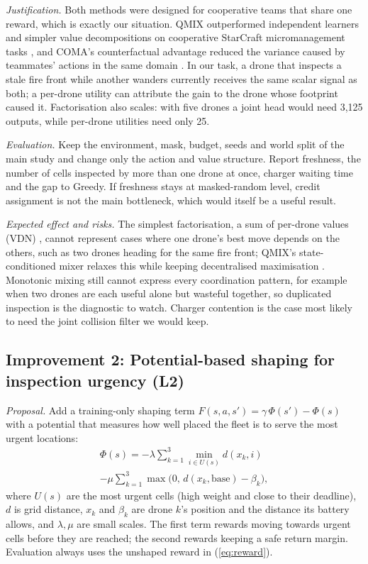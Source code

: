 \emph{Justification.} Both methods were designed for cooperative teams that share one reward,
which is exactly our situation. QMIX outperformed independent learners and simpler value
decompositions on cooperative StarCraft micromanagement tasks \cite{rashid2018}, and COMA's
counterfactual advantage reduced the variance caused by teammates' actions in the same domain
\cite{foerster2018coma}. In our task, a drone that inspects a stale fire front while another
wanders currently receives the same scalar signal as both; a per-drone utility can attribute
the gain to the drone whose footprint caused it. Factorisation also scales: with five
drones a joint head would need 3{,}125 outputs, while per-drone utilities need only 25.

\emph{Evaluation.} Keep the environment, mask, budget, seeds and world split of the main study
and change only the action and value structure. Report freshness, the number of
cells inspected by more than one drone at once, charger waiting time and the gap to Greedy.
If freshness stays at masked-random level, credit assignment is not the main bottleneck,
which would itself be a useful result.

\emph{Expected effect and risks.} The simplest factorisation, a sum of per-drone values (VDN)
\cite{sunehag2018}, cannot represent cases where one drone's best move depends on the others,
such as two drones heading for the same fire front; QMIX's state-conditioned mixer relaxes
this while keeping decentralised maximisation \cite{rashid2018}. Monotonic mixing still cannot
express every coordination pattern, for example when two drones are each useful alone but
wasteful together, so duplicated inspection is the diagnostic to watch. Charger contention is
the case most likely to need the joint collision filter we would keep.

\subsection{Improvement 2: Potential-based shaping for inspection urgency (L2)}

\emph{Proposal.} Add a training-only shaping term
$F(s, a, s') = \gamma\,\Phi(s') - \Phi(s)$ with a potential that measures how well placed the
fleet is to serve the most urgent locations:
\begin{multline}
\Phi(s) = -\lambda \sum_{k=1}^{3} \min_{i \in U(s)} d(x_k, i) \\
- \mu \sum_{k=1}^{3} \max\bigl(0,\, d(x_k, \text{base}) - \beta_k\bigr),
\end{multline}
where $U(s)$ are the most urgent cells (high weight and close to their deadline), $d$ is grid
distance, $x_k$ and $\beta_k$ are drone $k$'s position and the distance its battery allows, and
$\lambda, \mu$ are small scales. The first term rewards moving towards urgent cells before they
are reached; the second rewards keeping a safe return margin. Evaluation always uses the
unshaped reward in (\ref{eq:reward}).

